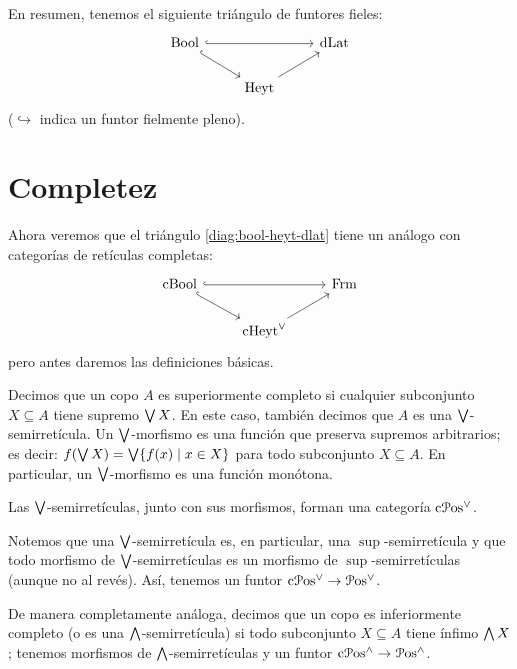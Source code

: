 En resumen, tenemos el siguiente triángulo de funtores fieles:
\begin{equation} \label{diag:bool-heyt-dlat}
\begin{tikzcd}
  \Bool \ar[dr,hook] \ar[rr,hook] &               & \DLat \\
                                  & \Heyt \ar[ur]
\end{tikzcd}
\end{equation}
($\hookrightarrow$ indica un funtor fielmente pleno).

\section{Completez}
\label{ss:completez}
Ahora veremos que el triángulo \eqref{diag:bool-heyt-dlat}
tiene un análogo con categorías de retículas completas:
\begin{equation} \label{diag:cbool-cheyt-frm}
\begin{tikzcd}
  \CBA \ar[dr,hook] \ar[rr,hook] &               & \Frm \\
                                  & \cHeyt \ar[ur]
\end{tikzcd}
\end{equation}
pero antes daremos las definiciones básicas.

\begin{definition}
  Decimos que un copo $A$ es superiormente completo
  si cualquier subconjunto $X\subseteq A$ tiene supremo $\bigvee X$.
  En este caso, también decimos que $A$ es una $\bigvee$-semirretícula.
  Un $\bigvee$-morfismo es una función que preserva supremos arbitrarios;
  es decir: $f(\bigvee X)=\bigvee\{f(x)\mid x\in X\}$
  para todo subconjunto $X\subseteq A$. En particular, un
  $\bigvee$-morfismo es una función monótona.

  Las $\bigvee$-semirretículas, junto con sus morfismos,
  forman una categoría $\mathrm{c}\mathcal{P}\mathrm{os}^\vee$.
\end{definition}
Notemos que una $\bigvee$-semirretícula es, en particular,
una $\sup$-semirretícula y que todo morfismo de $\bigvee$-semirretículas es
un morfismo de $\sup$-semirretículas (aunque no al revés).
Así, tenemos un funtor $\mathrm{c}\mathcal{P}\mathrm{os}^\vee\to\mathcal{P}\mathrm{os}^\vee$.

De manera completamente análoga, decimos que un copo es
inferiormente completo (o es una $\bigwedge$-semirretícula)
si todo subconjunto $X\subseteq A$ tiene ínfimo $\bigwedge X$; tenemos
morfismos de $\bigwedge$-semirretículas y un funtor
$\mathrm{c}\mathcal{P}\mathrm{os}^\wedge\to\mathcal{P}\mathrm{os}^{\wedge}$.

